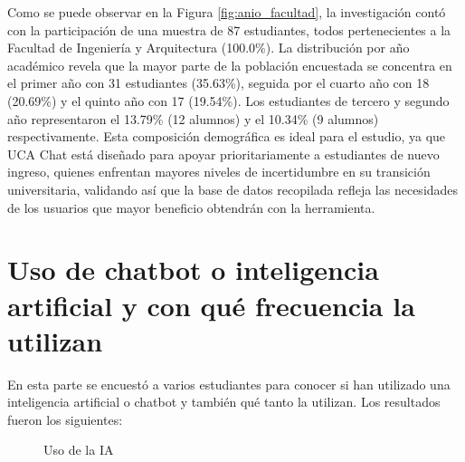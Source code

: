{{        Como se puede observar en la Figura \ref{fig:anio_facultad}, la investigación contó con la participación de una muestra de 87 estudiantes, todos pertenecientes a la Facultad de Ingeniería y Arquitectura (100.0\%). La distribución por año académico revela que la mayor parte de la población encuestada se concentra en el primer año con 31 estudiantes (35.63\%), seguida por el cuarto año con 18 (20.69\%) y el quinto año con 17 (19.54\%). Los estudiantes de tercero y segundo año representaron el 13.79\% (12 alumnos) y el 10.34\% (9 alumnos) respectivamente. Esta composición demográfica es ideal para el estudio, ya que UCA Chat está diseñado para apoyar prioritariamente a estudiantes de nuevo ingreso, quienes enfrentan mayores niveles de incertidumbre en su transición universitaria, validando así que la base de datos recopilada refleja las necesidades de los usuarios que mayor beneficio obtendrán con la herramienta.

        \section{Uso de chatbot o inteligencia artificial y con qué frecuencia la utilizan }
        En esta parte se encuestó a varios estudiantes para conocer si han utilizado una inteligencia artificial o chatbot y también qué tanto la utilizan. Los resultados fueron los siguientes:
        \begin{figure}[H]
            \centering
            \caption{Uso de la IA}
            \label{fig:uso_ia}
        \end{figure}
        
}}

